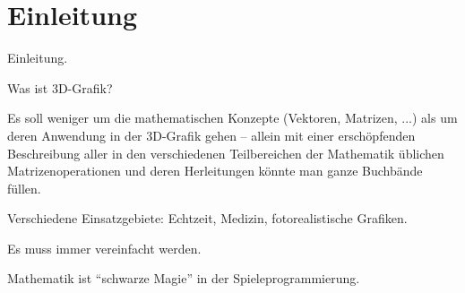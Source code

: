 \chapter{Einleitung}

Einleitung.

Was ist 3D-Grafik?

Es soll weniger um die mathematischen Konzepte (Vektoren, Matrizen, ...) als um deren Anwendung in der 3D-Grafik gehen -- allein mit einer erschöpfenden Beschreibung aller in den verschiedenen Teilbereichen der Mathematik üblichen Matrizenoperationen und deren Herleitungen könnte man ganze Buchbände füllen.

Verschiedene Einsatzgebiete: Echtzeit, Medizin, fotorealistische Grafiken.

Es muss immer vereinfacht werden.

Mathematik ist \enquote{schwarze Magie} in der Spieleprogrammierung.